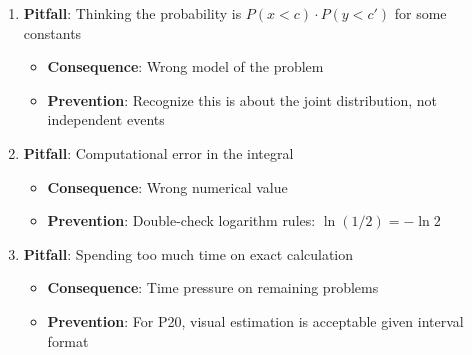 \documentclass[11pt]{article}
\begin{document}
\begin{solutionbox}
\begin{enumerate}
    \item \textbf{Pitfall}: Thinking the probability is $P(x < c) \cdot P(y < c')$ for some constants
    \begin{itemize}
        \item \textbf{Consequence}: Wrong model of the problem
        \item \textbf{Prevention}: Recognize this is about the joint distribution, not independent events
    \end{itemize}
    
    \item \textbf{Pitfall}: Computational error in the integral
    \begin{itemize}
        \item \textbf{Consequence}: Wrong numerical value
        \item \textbf{Prevention}: Double-check logarithm rules: $\ln(1/2) = -\ln 2$
    \end{itemize}
    
    \item \textbf{Pitfall}: Spending too much time on exact calculation
    \begin{itemize}
        \item \textbf{Consequence}: Time pressure on remaining problems
        \item \textbf{Prevention}: For P20, visual estimation is acceptable given interval format
    \end{itemize}
\end{enumerate}
\end{solutionbox}
\end{document}
